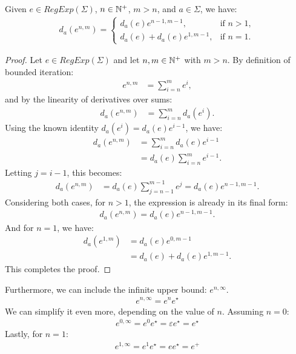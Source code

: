 \begin{thm}
	Given $e \in RegExp(\Sigma)$, $n \in {\mathbb{N}^{+}}$, $m > n$, and $a \in \Sigma$, we have:
	\begin{align*}
		d_a(e^{n,m}) =
		\begin{cases}
			d_a(e) e^{n-1,m-1}, & \text{if } n > 1, \\
			d_a(e) + d_a(e) e^{1,m-1}, & \text{if } n = 1.
		\end{cases}
	\end{align*}
\end{thm}

\begin{proof}
	Let $e \in RegExp(\Sigma)$ and let $n, m \in {\mathbb{N}^{+}}$ with $m > n$. By definition of bounded iteration:
	\begin{align*}
		e^{n,m} &= \sum_{i=n}^{m} e^i,
	\end{align*}
	and by the linearity of derivatives over sums:
	\begin{align*}
		d_a(e^{n,m}) &= \sum_{i=n}^{m} d_a(e^i).
	\end{align*}
	Using the known identity $d_a(e^i) = d_a(e) e^{i-1}$, we have:
	\begin{align*}
		d_a(e^{n,m}) &= \sum_{i=n}^{m} d_a(e) e^{i-1} \\
		&= d_a(e) \sum_{i=n}^{m} e^{i-1}.
	\end{align*}
	Letting $j = i - 1$, this becomes:
	\begin{align*}
		d_a(e^{n,m}) &= d_a(e) \sum_{j=n-1}^{m-1} e^j = d_a(e) e^{n-1,m-1}.
	\end{align*}
	Considering both cases, for $n > 1$, the expression is already in its final form:
	\begin{align*}
		d_a(e^{n,m}) = d_a(e) e^{n-1,m-1}.
	\end{align*}
	And for $n = 1$, we have:
	\begin{align*}
		d_a(e^{1,m}) &= d_a(e) e^{0,m-1} \\
		&= d_a(e) + d_a(e) e^{1,m-1}.
	\end{align*}
	This completes the proof.
\end{proof}
Furthermore, we can include the infinite upper bound: $e^{n,\infty}$.
\begin{align*}
	e^{n,\infty} = e^ne^\star
\end{align*}
We can simplify it even more, depending on the value of $n$. Assuming $n=0$:
\begin{align*}
	e^{0,\infty} = e^0e^\star = \varepsilon e^\star =  e^\star
\end{align*}
Lastly, for $n=1$:
\begin{align*}
	e^{1,\infty} = e^1e^\star = ee^\star =  e^+
\end{align*}

